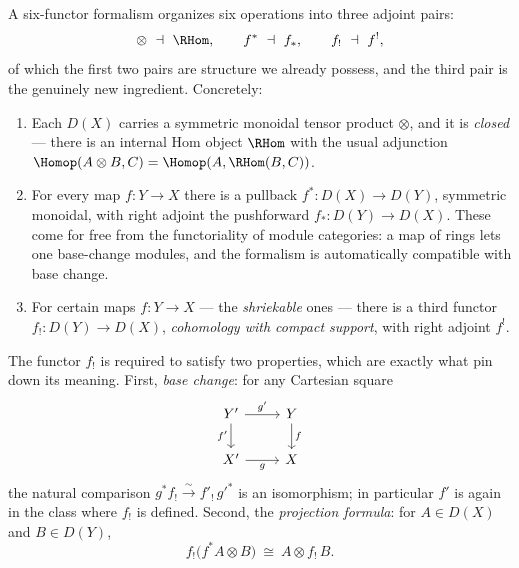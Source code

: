 \begin{remark}
\label{rmk:16:six-functors}
A six-functor formalism organizes six operations into three adjoint pairs:
\begin{equation*}
\otimes\ \dashv\ \RHom,\qquad f^*\ \dashv\ f_*,\qquad f_!\ \dashv\ f^!,
\end{equation*}
of which the first two pairs are structure we already possess, and the third pair
is the genuinely new ingredient. Concretely:
\begin{enumerate}
\item Each $D(X)$ carries a symmetric monoidal tensor product $\otimes$, and it is
\emph{closed} --- there is an internal Hom object $\RHom$ with the usual adjunction
$\Homop(A\otimes B,C)=\Homop(A,\RHom(B,C))$.
\item For every map $f\colon Y\to X$ there is a pullback $f^*\colon D(X)\to D(Y)$,
symmetric monoidal, with right adjoint the pushforward $f_*\colon D(Y)\to D(X)$.
These come for free from the functoriality of module categories: a map of rings lets
one base-change modules, and the formalism is automatically compatible with base
change.
\item For certain maps $f\colon Y\to X$ --- the \emph{shriekable} ones --- there is a
third functor $f_!\colon D(Y)\to D(X)$, \emph{cohomology with compact support}, with
right adjoint $f^!$.
\end{enumerate}
\end{remark}

\begin{remark}
\label{rmk:16:fshriek-properties}
The functor $f_!$ is required to satisfy two properties, which are exactly what pin
down its meaning. First, \emph{base change}: for any Cartesian square
\begin{equation*}
\begin{tikzcd}
Y' \arrow[r, "g'"] \arrow[d, "f'"'] & Y \arrow[d, "f"] \\
X' \arrow[r, "g"'] & X
\end{tikzcd}
\end{equation*}
the natural comparison $g^*f_!\xrightarrow{\ \sim\ }f'_!\,g'^*$ is an isomorphism;
in particular $f'$ is again in the class where $f_!$ is defined. Second, the
\emph{projection formula}: for $A\in D(X)$ and $B\in D(Y)$,
\begin{equation}
\label{eq:16:projection-formula}
f_!\bigl(f^*A\otimes B\bigr)\ \cong\ A\otimes f_!\,B.
\end{equation}
\end{remark}


